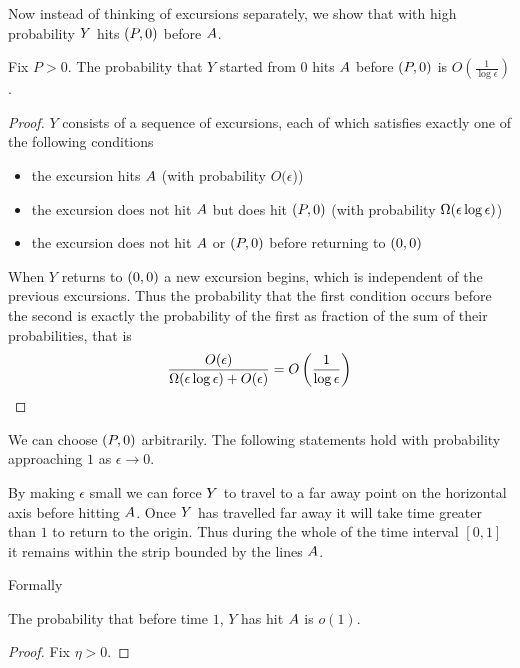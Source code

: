 {Now instead of thinking of excursions separately, we show that with
high probability $Y$ hits $(P,0)$ before $A$.

\begin{lemma}
  Fix $P > 0$.  The probability that $Y$ started from $0$ hits
  $A$ before $(P,0)$ is $O(\frac{1}{\log\epsilon})$.
\end{lemma}

\newcommand{\Oe}{O(\epsilon)}

\begin{proof}
  $Y$ consists of a sequence of excursions, each of which satisfies
  exactly one of the following conditions
  \begin{itemize}
  \item the excursion hits $A$ (with probability
    $O(\epsilon$))
  \item the excursion does not hit $A$ but does hit
    $(P,0)$ (with probability $\Omega(\epsilon\log\epsilon)$)
  \item the excursion does not hit $A$ or $(P,0)$ before
    returning to $(0,0)$
  \end{itemize}
  When $Y$ returns to $(0,0)$ a new excursion begins, which is independent of
  the previous excursions.  Thus the probability that the first
  condition occurs before the second is exactly the probability of the
  first as fraction of the sum of their probabilities, that is
  \[
  \frac{\Oe}{\Omegaeloge + \Oe} = O\left(\frac{1}{\log\epsilon}\right)
  \]
\end{proof}

We can choose $(P,0)$ arbitrarily.  The following statements hold
with probability approaching $1$ as $\epsilon \to 0$.

By making $\epsilon$ small we can force $Y$ to travel to a far
away point on the horizontal axis before hitting $A$.
Once $Y$ has travelled far away it will take time greater than
$1$ to return to the origin.  Thus during the whole of the time
interval $[0,1]$ it remains within the strip bounded by the lines
$A$.

Formally

\begin{lemma}
  The probability that before time $1$, $Y$ has hit $A$
  is $o(1)$.
\end{lemma}

\begin{proof}
  Fix $\eta > 0$.


\end{proof}}
